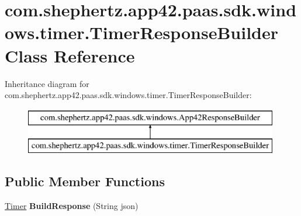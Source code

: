 \hypertarget{classcom_1_1shephertz_1_1app42_1_1paas_1_1sdk_1_1windows_1_1timer_1_1_timer_response_builder}{\section{com.\+shephertz.\+app42.\+paas.\+sdk.\+windows.\+timer.\+Timer\+Response\+Builder Class Reference}
\label{classcom_1_1shephertz_1_1app42_1_1paas_1_1sdk_1_1windows_1_1timer_1_1_timer_response_builder}
}
Inheritance diagram for com.\+shephertz.\+app42.\+paas.\+sdk.\+windows.\+timer.\+Timer\+Response\+Builder\+:\begin{figure}[H]
\begin{center}
\leavevmode
\includegraphics[height=2.000000cm]{classcom_1_1shephertz_1_1app42_1_1paas_1_1sdk_1_1windows_1_1timer_1_1_timer_response_builder}
\end{center}
\end{figure}
\subsection*{Public Member Functions}
\begin{DoxyCompactItemize}
\item 
\hypertarget{classcom_1_1shephertz_1_1app42_1_1paas_1_1sdk_1_1windows_1_1timer_1_1_timer_response_builder_ae5e06028562582a1fa04e221b0085b41}{\hyperlink{classcom_1_1shephertz_1_1app42_1_1paas_1_1sdk_1_1windows_1_1timer_1_1_timer}{Timer} {\bfseries Build\+Response} (String json)}\label{classcom_1_1shephertz_1_1app42_1_1paas_1_1sdk_1_1windows_1_1timer_1_1_timer_response_builder_ae5e06028562582a1fa04e221b0085b41}

\end{DoxyCompactItemize}
